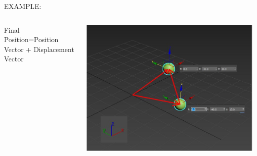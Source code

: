 \documentclass[]{beamer}
\begin{document}
  \begin{frame}
  
  
  EXAMPLE:
  
  
  
  
  
  
  
  \begin{columns}
  
  Final Position=Position Vector + Displacement Vector
  
  
  
  \begin{center}
       \includegraphics[width=1.1\textwidth]{images/exampleVS5.jpg}      
       \end{center}
  
  
  \end{columns}
  
  
  
  
   \end{frame}
  
  
\end{document}
